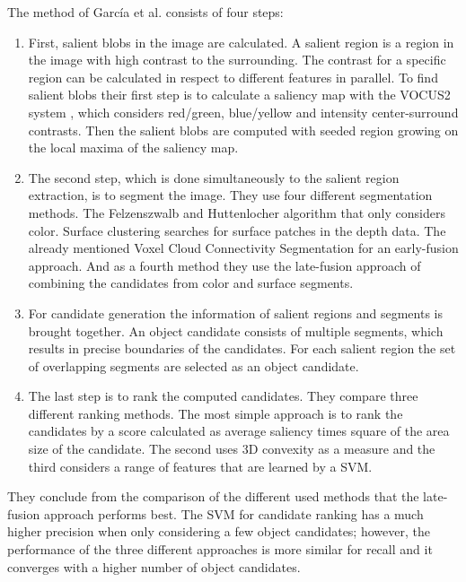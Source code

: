 \documentclass[a4paper,11pt,english]{article}
\begin{document}
The method of García et al. consists of four steps:

\begin{enumerate}
	\item First, salient blobs in the image are calculated.
	A salient region is a region in the image with high contrast to the surrounding.
	The contrast for a specific region can be calculated in respect to different features in parallel.
	To find salient blobs their first step is to calculate a saliency map with the VOCUS2 system \cite{frintrop2015traditional}, which considers red/green, blue/yellow and intensity center-surround contrasts.
	Then the salient blobs are computed with seeded region growing on the local maxima of the saliency map.
	\item The second step, which is done simultaneously to the salient region extraction, is to segment the image.
	They use four different segmentation methods. The Felzenszwalb and Huttenlocher algorithm \cite{felzenszwalb2004efficient} that only considers color. Surface clustering searches for surface patches in the depth data. The already mentioned Voxel Cloud Connectivity Segmentation for an early-fusion approach. And as a fourth method they use the late-fusion approach of combining the candidates from color and surface segments.
	\item For candidate generation the information of salient regions and segments is brought together.
	An object candidate consists of multiple segments, which results in precise boundaries of the candidates.
	For each salient region the set of overlapping segments are selected as an object candidate.
	\item The last step is to rank the computed candidates. They compare three different ranking methods.
	The most simple approach is to rank the candidates by a score calculated as average saliency times square of the area size of the candidate.
	The second uses 3D convexity as a measure and the third considers a range of features that are learned by a SVM.
\end{enumerate}

They conclude from the comparison of the different used methods that the late-fusion approach performs best.
The SVM for candidate ranking has a much higher precision when only considering a few object candidates; however, the performance of the three different approaches is more similar for recall and it converges with a higher number of object candidates.
\end{document}
